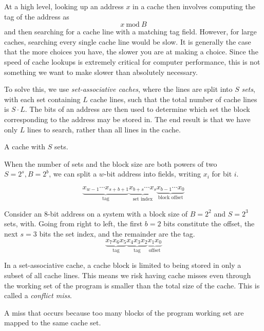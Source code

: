 At a high level, looking up an address $x$ in a cache then involves
computing the tag of the address as
\[
  x~\text{mod}~B
\]
and then searching for a cache line with a matching tag field.
However, for large caches, searching every single cache line would be
slow.  It is generally the case that the more choices you have, the
slower you are at making a choice.  Since the speed of cache lookups
is extremely critical for computer performance, this is not something
we want to make slower than absolutely necessary.

To solve this, we use \emph{set-associative caches}, where the lines
are split into $S$ \emph{sets}, with each set containing $L$ cache
lines, such that the total number of cache lines is $S\cdot{}L$.  The
bits of an address are then used to determine which set the block
corresponding to the address may be stored in.  The end result is that
we have only $L$ lines to search, rather than all lines in the cache.

\begin{definition}
  A cache with $S$ sets.
\end{definition}

When the number of sets and the block size are both powers of two
$S=2^{s}, B=2^{b}$, we can split a $w$-bit address into fields,
writing $x_{i}$ for bit $i$.

\[
  \underbrace{x_{w-1}\cdots{}x_{s+b+1}}_{\text{tag}}
  \underbrace{x_{b+s}\cdots{}x_{s}}_{\text{set index}}
  \underbrace{x_{b-1}\cdots{}x_{0}}_{\text{block offset}}
\]

\begin{example}
  Consider an $8$-bit address on a system with a block size of
  $B=2^{2}$ and $S=2^{3}$ sets, with.  Going from right to left, the
  first $b=2$ bits constitute the offset, the next $s=3$ bits the set
  index, and the remainder are the tag.
  \[
    \underbrace{x_{7}x_{6}x_{5}}_{\text{tag}}
    \underbrace{x_{4}x_{3}x_{2}}_{\text{tag}}
    \underbrace{x_{1}x_{0}}_{\text{offset}}
  \]
\end{example}

In a set-associative cache, a cache block is limited to being stored
in only a subset of all cache lines.  This means we risk having cache
misses even through the working set of the program is smaller than the
total size of the cache.  This is called a \emph{conflict miss}.

\begin{definition}
  A miss that occurs because too many blocks of the program working
  set are mapped to the same cache set.
\end{definition}

